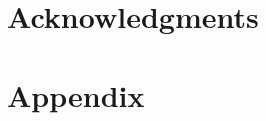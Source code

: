 \documentclass{article}
\begin{document}
\section*{Acknowledgments}






\appendix

\section{Appendix}
\label{sec:appendix}

\end{document}
